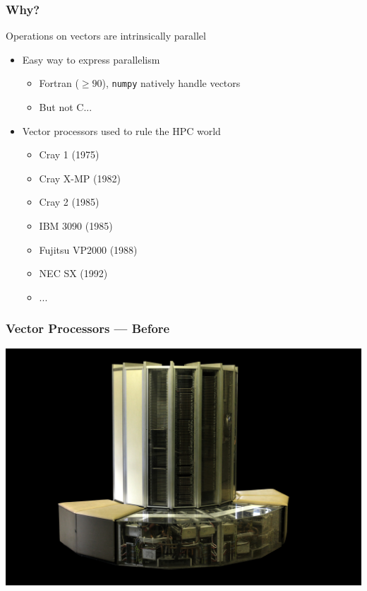 \documentclass[xcolor={x11names,svgnames}]{beamer}
\begin{document}
\begin{frame}
  \frametitle{Why?}

  \begin{block}{Operations on vectors are \alert{intrinsically parallel}}
    \begin{itemize}
    \item Easy way to express parallelism
      \begin{itemize}
      \item Fortran ($\geq 90$), \texttt{numpy} natively handle vectors
      \item But not C...
      \end{itemize}

      \medskip
      
    \item \alert{Vector processors} used to rule the HPC world
      \begin{itemize}
      \item Cray 1 (1975)
      \item Cray X-MP (1982)
      \item Cray 2 (1985)
      \item IBM 3090 (1985)
      \item Fujitsu VP2000 (1988)
      \item NEC SX (1992)
      \item ...
      \end{itemize}
    \end{itemize}
  \end{block}
\end{frame}


\begin{frame}
  \frametitle{Vector Processors --- Before}
  \centering
  \includegraphics[width=\textwidth]{Cray_1.jpg}

\end{frame}
\end{document}
